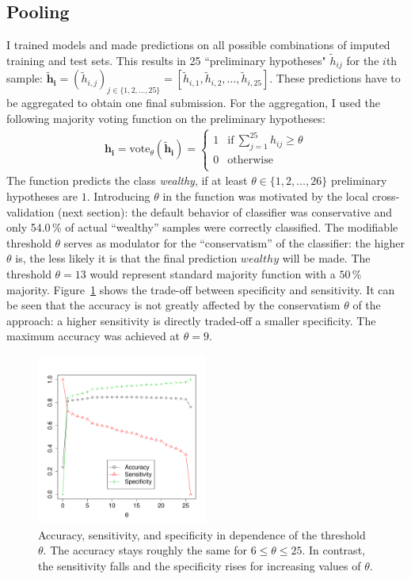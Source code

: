 \documentclass[a4paper]{article}
\begin{document}
\subsection{Pooling}
\label{sec:pooling}

I trained models and made predictions on all possible combinations of
imputed training and test sets. This results in 25 ``preliminary
hypotheses" $\tilde{h}_{ij}$ for the $i$th sample:
$\mathbf{\tilde{h}_i} = (\tilde{h}_{i,j})_{j \in \{1, 2, \ldots, 25\}} = [\tilde{h}_{i,1}, \tilde{h}_{i,2}, \ldots, \tilde{h}_{i,25}]$. These
predictions have to be aggregated to obtain one final submission. For
the aggregation, I used the following majority voting function on the
preliminary hypotheses:
\begin{align}
\mathbf{h_i} = \text{vote}_\theta(\mathbf{\tilde{h}_i}) =
\begin{cases}
1 & \text{if}~\sum_{j = 1}^{25} h_{ij} \geq \theta\\
0 & \text{otherwise }\\
\end{cases}
\end{align}
The function predicts the class \emph{wealthy}, if at least
$\theta \in \{1, 2, \ldots, 26\}$ preliminary hypotheses are
$1$. Introducing $\theta$ in the function was motivated by the local
cross-validation (next section): the default behavior of classifier
was conservative and only 54.0\,\% of actual ``wealthy'' samples were
correctly classified. The modifiable threshold $\theta$ serves as
modulator for the ``conservatism'' of the classifier: the higher
$\theta$ is, the less likely it is that the final prediction $wealthy$
will be made. The threshold $\theta = 13$ would represent standard
majority function with a $50\,\%$ majority.  Figure~\ref{fig:tuning}
shows the trade-off between specificity and sensitivity. It can be
seen that the accuracy is not greatly affected by the conservatism
$\theta$ of
the approach: a higher sensitivity is directly traded-off a
smaller specificity. The maximum accuracy was achieved at
$\theta = 9$.

\begin{figure}[h]
  \centering
  \includegraphics[width=0.5\textwidth]{../Python/theta}
  \caption{Accuracy, sensitivity, and specificity in dependence of the
    threshold $\theta$. The accuracy stays roughly the same for
    $6 \leq \theta \leq 25$. In contrast, the sensitivity falls and
    the specificity rises for increasing values of $\theta$.}
  \label{fig:tuning}
\end{figure}
\end{document}
